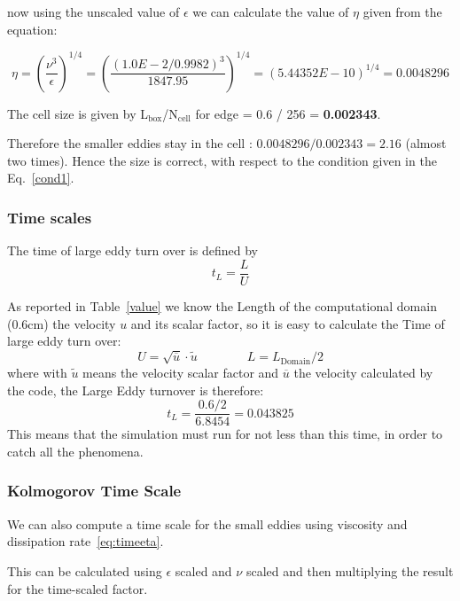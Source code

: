 now using the unscaled value of $\epsilon$ we can calculate 
the value of $\eta$ given from the equation: 

\begin{equation}
\eta = \left( \frac{\nu^3}{\epsilon} \right) ^{1/4} =  
\left( \frac{(1.0E-2/0.9982)^3}{1847.95} \right) ^{1/4} = (5.44352E-10)^{1/4} = \mathbf{0.0048296}
\end{equation}

The cell size is given by L$_\text{box}$/N$_{\text{cell}}$ for edge = 0.6 / 256 = \textbf{0.002343}.

Therefore the smaller eddies stay in the cell : $0.0048296/0.002343 = 2.16$ (almost two times). Hence the size is correct, with respect to the condition given in the Eq.~\ref{cond1}. 

\subsubsection{Time scales}
The time of large eddy turn over is defined by 
\begin{equation}
t_L = \frac{L}{U} 
\end{equation}

As reported in Table~\ref{value} we know the Length of the computational domain (0.6cm) the velocity $u$ and its scalar factor, so it is easy to calculate the Time of large eddy turn over:
$$U = \sqrt{\overline{u}} \cdot \tilde{u} \qquad  \qquad L = L_{\text{Domain}}/2 $$
where with $\tilde{u}$ means the velocity scalar factor and $\overline{u}$ the velocity calculated by the code, the Large Eddy turnover is therefore:
\begin{equation}
t_L = \frac{0.6/2}{6.8454} = \mathbf{0.043825} 
\end{equation}
This means that the simulation must run for not less than this time, in order to catch all the phenomena. 

\subsubsection{Kolmogorov Time Scale}
We can also compute a time scale for the small eddies using viscosity and dissipation rate~\ref{eq:timeeta}.


This can be calculated using $\epsilon$ scaled and $\nu$ scaled and then multiplying the result for the time-scaled factor.


